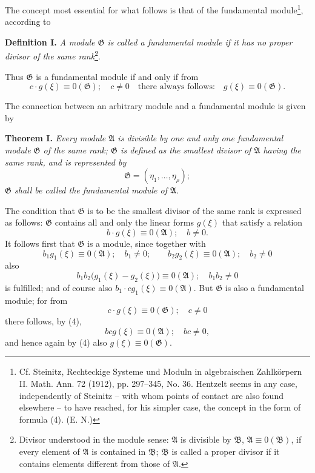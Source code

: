\documentclass[11pt]{article}
\newcommand{\Amod}{\mathfrak A}
\newcommand{\Bmod}{\mathfrak B}
\newcommand{\Gmod}{\mathfrak G}
\newcommand{\zero}[1]{\equiv 0(#1)}
\begin{document}
The concept most essential for what follows is that of the fundamental module\footnote{Cf. Steinitz, Rechteckige Systeme und Moduln in algebraischen Zahlkörpern II. Math. Ann. 72 (1912), pp. 297--345, No. 36. Hentzelt seems in any case, independently of Steinitz -- with whom points of contact are also found elsewhere -- to have reached, for his simpler case, the concept in the form of formula (4). (E. N.)}, according to

\medskip
\noindent\textbf{Definition I.} \emph{A module $\Gmod$ is called a fundamental module if it has no proper divisor of the same rank}\footnote{Divisor understood in the module sense: $\Amod$ is divisible by $\Bmod$, $\Amod\zero{\Bmod}$, if every element of $\Amod$ is contained in $\Bmod$; $\Bmod$ is called a proper divisor if it contains elements different from those of $\Amod$.}.

Thus $\Gmod$ is a fundamental module if and only if from
\begin{equation}
 c\cdot g(\xi)\zero{\Gmod};\quad c\ne0 \quad\text{there always follows:}\quad g(\xi)\zero{\Gmod}.
\tag{2}
\end{equation}

The connection between an arbitrary module and a fundamental module is given by

\medskip
\noindent\textbf{Theorem I.} \emph{Every module $\Amod$ is divisible by one and only one fundamental module $\Gmod$ of the same rank; $\Gmod$ is defined as the smallest divisor of $\Amod$ having the same rank, and is represented by}
\begin{equation}
 \Gmod=(\eta_1,\ldots,\eta_\rho);
\tag{3}
\end{equation}
\emph{$\Gmod$ shall be called the fundamental module of $\Amod$.}

The condition that $\Gmod$ is to be the smallest divisor of the same rank is expressed as follows: $\Gmod$ contains all and only the linear forms $g(\xi)$ that satisfy a relation
\begin{equation}
 b\cdot g(\xi)\zero{\Amod};\quad b\ne0.
\tag{4}
\end{equation}
It follows first that $\Gmod$ is a module, since together with
\[
 b_1g_1(\xi)\zero{\Amod};\quad b_1\ne0;
 \qquad
 b_2g_2(\xi)\zero{\Amod};\quad b_2\ne0
\]
also
\[
 b_1b_2\bigl(g_1(\xi)-g_2(\xi)\bigr)\zero{\Amod};\quad b_1b_2\ne0
\]
is fulfilled; and of course also $b_1\cdot c g_1(\xi)\zero{\Amod}$. But $\Gmod$ is also a fundamental module; for from
\[
 c\cdot g(\xi)\zero{\Gmod};\quad c\ne0
\]
there follows, by (4),
\[
 b c g(\xi)\zero{\Amod};\quad bc\ne0,
\]
and hence again by (4) also $g(\xi)\zero{\Gmod}$.
\end{document}
